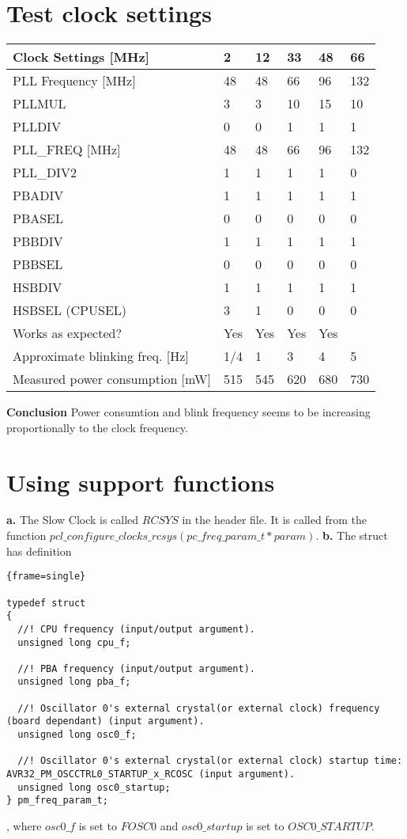 \documentclass[10pt, a4paper]{article}
\begin{document}
\lstset{language=C,
        breaklines=true
        }
\section{Test clock settings}
\begin{table}[H]
\centering
\begin{tabular}{l | l l l l l}
Clock Settings [MHz] & 2 & 12 & 33 & 48 & 66 \\
\hline
PLL Frequency [MHz]  & 48 & 48  & 66 & 96 & 132\\
\hline
PLLMUL & 3 & 3 & 10 & 15 & 10 \\
\hline
PLLDIV& 0 & 0 & 1 & 1 & 1 \\
\hline
PLL\_FREQ [MHz]& 48 & 48 & 66 & 96 & 132 \\
\hline
PLL\_DIV2& 1 & 1 & 1 & 1 & 0 \\
\hline
PBADIV& 1 & 1 & 1& 1 & 1\\
\hline
PBASEL& 0 & 0 & 0 & 0 & 0\\
\hline
PBBDIV& 1 & 1 & 1 & 1 & 1 \\
\hline
PBBSEL& 0 & 0 & 0 & 0 & 0\\
\hline
HSBDIV& 1 & 1 & 1 & 1 & 1\\
\hline
HSBSEL (CPUSEL)& 3 & 1 & 0 & 0 & 0\\
\hline
Works as expected?& Yes & Yes & Yes & Yes & \\
\hline
Approximate blinking freq. [Hz]& 1/4 & 1  & 3 & 4 & 5 \\
\hline
Measured power consumption [mW] & 515 & 545 & 620 & 680 & 730 \\
\hline

\end{tabular}
\end{table}


\textbf{Conclusion}\newline
Power consumtion and blink frequency seems to be increasing proportionally to the clock frequency.
\section{Using support functions}
\textbf{a.} The Slow Clock is called $RCSYS$ in the header file. It is called
from the function $pcl\_configure\_clocks\_rcsys(pc\_freq\_param\_t *param)$. \newline
\textbf{b.} The struct has definition
\begin{lstlisting}{frame=single}

typedef struct
{
  //! CPU frequency (input/output argument).
  unsigned long cpu_f;

  //! PBA frequency (input/output argument).
  unsigned long pba_f;

  //! Oscillator 0's external crystal(or external clock) frequency (board dependant) (input argument).
  unsigned long osc0_f;

  //! Oscillator 0's external crystal(or external clock) startup time: AVR32_PM_OSCCTRL0_STARTUP_x_RCOSC (input argument).
  unsigned long osc0_startup;
} pm_freq_param_t;

\end{lstlisting}
, where $osc0\_f$ is set to $FOSC0$ and $osc0\_startup$ is set to $OSC0\_STARTUP$.
\end{document}
